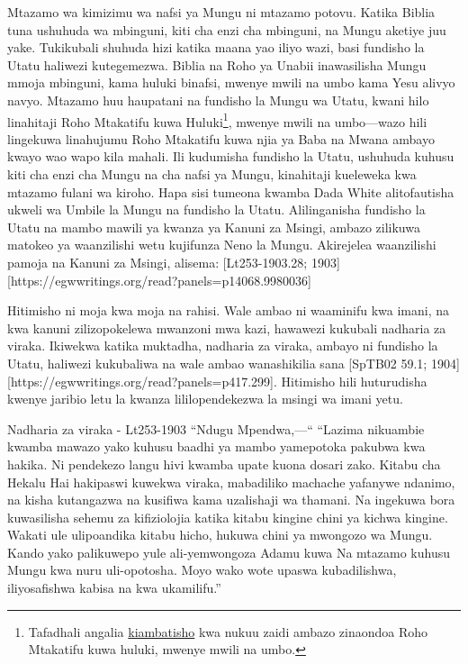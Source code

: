 Mtazamo wa kimizimu wa nafsi ya Mungu ni mtazamo potovu. Katika Biblia tuna ushuhuda wa mbinguni, kiti cha enzi cha mbinguni, na Mungu aketiye juu yake. Tukikubali shuhuda hizi katika maana yao iliyo wazi, basi fundisho la Utatu haliwezi kutegemezwa. Biblia na Roho ya Unabii inawasilisha Mungu mmoja mbinguni, kama huluki binafsi, mwenye mwili na umbo kama Yesu alivyo navyo. Mtazamo huu haupatani na fundisho la Mungu wa Utatu, kwani hilo linahitaji Roho Mtakatifu kuwa Huluki\footnote{Tafadhali angalia \hyperref[appendix:unauthenticated-reports]{kiambatisho} kwa nukuu zaidi ambazo zinaondoa Roho Mtakatifu kuwa huluki, mwenye mwili na umbo.}, mwenye mwili na umbo—wazo hili lingekuwa linahujumu Roho Mtakatifu kuwa njia ya Baba na Mwana ambayo kwayo wao wapo kila mahali. Ili kudumisha fundisho la Utatu, ushuhuda kuhusu kiti cha enzi cha Mungu na cha nafsi ya Mungu, kinahitaji kueleweka kwa mtazamo fulani wa kiroho. Hapa sisi tumeona kwamba Dada White alitofautisha ukweli wa Umbile la Mungu na fundisho la Utatu. Alilinganisha fundisho la Utatu na mambo mawili ya kwanza ya Kanuni za Msingi, ambazo zilikuwa matokeo ya waanzilishi wetu kujifunza Neno la Mungu. Akirejelea waanzilishi pamoja na Kanuni za Msingi, alisema: [Lt253-1903.28; 1903][https://egwwritings.org/read?panels=p14068.9980036]


Hitimisho ni moja kwa moja na rahisi. Wale ambao ni waaminifu kwa imani, na kwa kanuni zilizopokelewa mwanzoni mwa kazi, hawawezi kukubali nadharia za viraka. Ikiwekwa katika muktadha, nadharia za viraka, ambayo ni fundisho la Utatu, haliwezi kukubaliwa na wale ambao wanashikilia sana [SpTB02 59.1; 1904][https://egwwritings.org/read?panels=p417.299]. Hitimisho hili huturudisha kwenye jaribio letu la kwanza lililopendekezwa la msingi wa imani yetu.





Nadharia za viraka - Lt253-1903
“Ndugu Mpendwa,—“
“Lazima nikuambie kwamba mawazo yako kuhusu baadhi ya mambo yamepotoka pakubwa kwa hakika. Ni pendekezo langu hivi kwamba upate kuona dosari zako. Kitabu cha Hekalu Hai hakipaswi kuwekwa viraka, mabadiliko machache yafanywe ndanimo, na kisha kutangazwa na kusifiwa kama uzalishaji wa thamani. Na ingekuwa bora kuwasilisha sehemu za kifiziolojia katika kitabu kingine chini ya kichwa kingine. Wakati ule ulipoandika kitabu hicho, hukuwa chini ya mwongozo wa Mungu. Kando yako palikuwepo yule ali-yemwongoza Adamu kuwa Na mtazamo kuhusu Mungu kwa nuru uli-opotosha. Moyo wako wote upaswa kubadilishwa, iliyosafishwa kabisa na kwa ukamilifu.”
